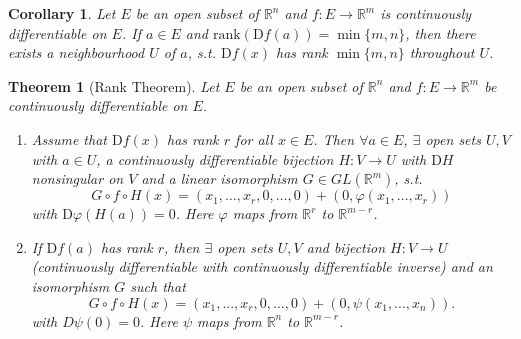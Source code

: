 \documentclass[12pt]{article}
\theoremstyle{plain}
\newtheorem{thm}{Theorem}
\newtheorem*{corollary}{Corollary}
\theoremstyle{definition}
\begin{document}
\begin{corollary}
    Let $E$ be an open subset of $\mathbb{R}^n$ and $f:E\rightarrow \mathbb{R}^m$ is continuously differentiable on $E$.
    If $a\in E$ and $\text{rank}(\mathrm{D}f(a)) = \min\{m,n\}$, then there exists a neighbourhood $U$ of $a$, s.t.
    $\mathrm{D}f(x)$ has rank $\min\{m,n\}$ throughout $U$.
\end{corollary}

\begin{thm}[Rank Theorem]
    Let $E$ be an open subset of $\mathbb{R}^n$ and $f:E\rightarrow\mathbb{R}^m$ be continuously differentiable on $E$.
    \begin{enumerate}
        \item
        Assume that $\mathrm{D}f(x)$ has rank $r$ for all $x\in E$.
        Then $\forall a\in E$, $\exists$ open sets $U, V$ with $a\in U$, a continuously differentiable bijection $H:V\rightarrow U$ with $\mathrm{D}H$
        nonsingular on $V$ and a linear isomorphism $G\in GL(\mathbb{R}^m)$, s.t.
        \[
            G\circ f\circ H(x) = (x_1,\ldots,x_r,0,\ldots,0)
            +(0,\varphi(x_1,...,x_r))
        \]
        with $\mathrm{D}\varphi(H(a)) = 0$.
        Here $\varphi$ maps from $\mathbb{R}^{r}$ to $\mathbb{R}^{m-r}$.

        \item
            If $\mathrm{D}f(a)$ has rank $r$, then $\exists$ open sets $U, V$ and bijection $H:V\rightarrow U$ (continuously differentiable with
            continuously differentiable inverse) and an isomorphism $G$ such that
            \[
                G\circ f\circ H(x) = (x_1,...,x_r,0,\ldots,0) + (0,\psi(x_1,...,x_n)).
            \]
            with $D\psi(0) = 0$.
            Here $\psi$ maps from $\mathbb{R}^{n}$ to $\mathbb{R}^{m-r}$.
    \end{enumerate}
\end{thm}
\end{document}
